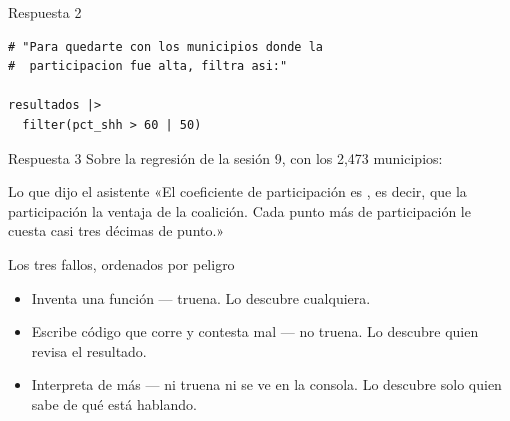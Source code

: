 \begin{frame}[fragile]{Respuesta 2}
\begin{lstlisting}
# "Para quedarte con los municipios donde la
#  participacion fue alta, filtra asi:"

resultados |>
  filter(pct_shh > 60 | 50)
\end{lstlisting}

  \vspace{0.7em}
\end{frame}

\begin{frame}{Respuesta 3}
  \vspace{0.3em}
  Sobre la regresión de la sesión 9, con los 2{,}473 municipios:

  \vspace{0.9em}
  \begin{block}{Lo que dijo el asistente}
    «El coeficiente de participación es , es decir, que la
    participación  la ventaja de la coalición. Cada punto más de
    participación le cuesta casi tres décimas de punto.»
  \end{block}

  \vspace{0.9em}
\end{frame}

\begin{frame}{Los tres fallos, ordenados por peligro}
  \vspace{0.5em}
  \begin{itemize}\setlength{\itemsep}{1.1em}
    \item<1-> \ac{Inventa una función} — truena. Lo descubre cualquiera.
    \item<2-> \ac{Escribe código que corre y contesta mal} — no truena.
          Lo descubre quien revisa el resultado.
    \item<3-> \ac{Interpreta de más} — ni truena ni se ve en la consola.
          Lo descubre solo quien sabe de qué está hablando.
  \end{itemize}

  \vspace{1.3em}
\end{frame}

